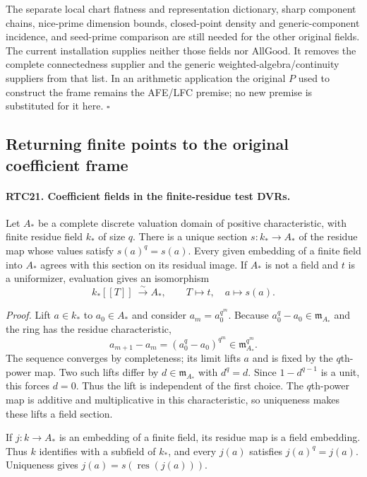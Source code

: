 The separate local chart flatness and representation dictionary,
sharp component chains, nice-prime dimension bounds, closed-point
density and generic-component incidence, and seed-prime comparison
are still needed for the other original fields.  The current
installation supplies neither those fields nor \(\mathrm{AllGood}\).
It removes the complete connectedness supplier and the generic
weighted-algebra/continuity suppliers from that list.  In an
arithmetic application the original \(P\) used to construct the
frame remains the AFE/LFC premise; no new premise is substituted
for it here. \hfill\(\square\)

\subsection{Returning finite points to the original coefficient frame}

\paragraph{RTC21. Coefficient fields in the finite-residue test DVRs.}
\label{claim:RTC21}
Let \(A_*\) be a complete discrete valuation domain of positive
characteristic, with finite residue field \(k_*\) of size \(q\).
There is a unique section \(s:k_*\to A_*\) of the residue map
whose values satisfy \(s(a)^q=s(a)\).  Every given embedding
of a finite field into \(A_*\) agrees with this section on its
residual image.  If \(A_*\) is not a field and \(t\) is a
uniformizer, evaluation gives an isomorphism
\[
 k_*[[T]]\ \xrightarrow{\ \sim\ } A_*,
       \qquad T\longmapsto t,\quad a\longmapsto s(a).
                                                        \tag{RTC.34}
\]

\emph{Proof.}
Lift \(a\in k_*\) to \(a_0\in A_*\) and consider
\(a_m=a_0^{q^m}\).  Because \(a_0^q-a_0\in\mathfrak m_{A_*}\)
and the ring has the residue characteristic,
\[
 a_{m+1}-a_m=(a_0^q-a_0)^{q^m}
       \in\mathfrak m_{A_*}^{q^m}.
\]
The sequence converges by completeness; its limit lifts \(a\)
and is fixed by the \(q\)th-power map.  Two such lifts differ
by \(d\in\mathfrak m_{A_*}\) with \(d^q=d\).  Since
\(1-d^{q-1}\) is a unit, this forces \(d=0\).  Thus the
lift is independent of the first choice.  The \(q\)th-power
map is additive and multiplicative in this characteristic, so
uniqueness makes these lifts a field section.

If \(j:k\to A_*\) is an embedding of a finite field, its
residue map is a field embedding.  Thus \(k\) identifies with
a subfield of \(k_*\), and every \(j(a)\) satisfies
\(j(a)^q=j(a)\).  Uniqueness gives
\(j(a)=s(\operatorname{res}(j(a)))\).

